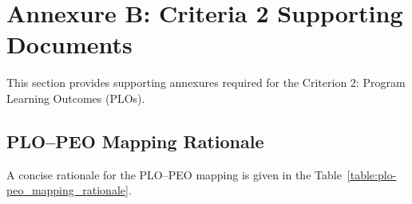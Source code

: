 \chapter*{Annexure B: Criteria 2 Supporting Documents}
\label{app:crtieria-2}

This section provides supporting annexures required for the Criterion 2: Program Learning Outcomes (PLOs).

\setcounter{section}{0}
\renewcommand{\thesection}{B.\arabic{section}}

\section{PLO--PEO Mapping Rationale}
\label{app:criteria-2_plo-peo_mapping_rationale}
A concise rationale for the PLO--PEO mapping is given in the Table~\ref{table:plo-peo_mapping_rationale}.


